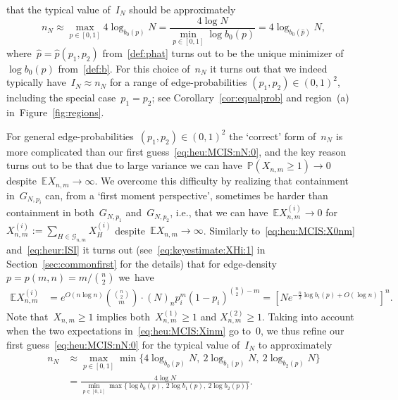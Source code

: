 \documentclass{article}
\renewcommand{\Pr}{\mathbb{P}}
\newcommand{\E}{\mathbb{E}}
\newcommand{\cG}{\mathcal{G}}
\newcommand{\ps}{\hat{p}}
\newcommand\bigcpar[1]{\bigl\{#1\bigr\}}
\begin{document}
that the typical value of~$I_N$ should be approximately
\begin{equation}\label{eq:heu:MCIS:nN:0}
n_N \approx \max_{p \in [0,1]}4\log_{b_0(p)} N = \frac{4 \log N}{\min_{p \in [0,1]} \log b_0(p)} = 4 \log_{b_0(\ps)} N ,
\end{equation}
where~$\ps=\ps(p_1,p_2)$ from~\eqref{def:phat} turns out to be the unique minimizer of~$\log b_0(p)$ from~\eqref{def:b}. For this choice of~$n_N$ it turns out that we indeed 
typically have~${I_N \approx n_N}$ for a range of edge-probabilities ${(p_1,p_2) \in (0,1)^2}$, including the special case~$p_1=p_2$; 
see Corollary~\ref{cor:equalprob} and region~(a) in~Figure~\ref{fig:regions}. 


For general edge-probabilities~${(p_1,p_2) \in (0,1)^2}$ the `correct' form of~$n_N$ is more complicated than our first guess~\eqref{eq:heu:MCIS:nN:0},
and the key reason turns out to be that due to large variance we can have~${\Pr(X_{n,m} \ge 1) \to 0}$ despite~${\E X_{n,m} \to \infty}$.
We overcome this difficulty by realizing that containment in~$G_{N,p_i}$ can, from a `first moment perspective', sometimes be harder than containment in both~$G_{N,p_1}$ and~$G_{N,p_2}$, 
i.e., that we can have~${\E X^{(i)}_{n,m} \to 0}$ for~$X^{(i)}_{n,m} := \sum_{H \in \cG_{n,m}}X^{(i)}_H$ despite~${\E X_{n,m} \to \infty}$.  
Similarly to~\eqref{eq:heu:MCIS:X0nm} and~\eqref{eq:heur:ISI} it turns out (see~\eqref{eq:keyestimate:XHi:1} in Section~\ref{sec:commonfirst} for the details)
that for edge-density~$p=p(m,n)=m/\binom{n}{2}$ we~have 
\begin{equation}\label{eq:heu:MCIS:Xinm}
\begin{split}
\E X^{(i)}_{n,m} 
&= 
e^{O(n\log n)} \binom{\binom{n}{2}}{m} \cdot (N)_n p_i^m(1-p_i)^{\binom{n}{2}-m}
    =\left[Ne^{-\frac{n}{2} \log {b_i}(p)+O(\log n)}\right]^n.
\end{split}
\end{equation}
Note that~$X_{n,m} \ge 1$ implies both~$X^{(1)}_{n,m} \ge 1$ and $X^{(2)}_{n,m} \ge 1$. 
Taking into account when the two expectations in~\eqref{eq:heu:MCIS:Xinm} go to~$0$, 
we thus refine our first guess~\eqref{eq:heu:MCIS:nN:0} for the typical value of~$I_N$ to approximately 
\begin{equation}\label{eq:heu:MCIS:nN}
\begin{split}
n_N & \approx \max_{p \in [0,1]}\min\bigcpar{4\log_{b_0(p)} N, \: 2\log_{b_1(p)} N, \: 2\log_{b_2(p)} N} \\
& = \frac{4 \log N}{\min_{p \in [0,1]} \max\bigcpar{\log b_0(p), \: 2\log b_1(p), \: 2\log b_2(p)}} .
\end{split}
\end{equation}
\end{document}
